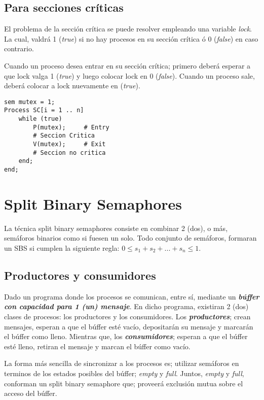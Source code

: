 \documentclass[a4paper, 10pt]{report}
\begin{document}
\subsection{Para secciones críticas}

El problema de la sección crítica se puede resolver empleando una variable \emph{lock}. La cual, valdrá 1 (\emph{true}) si no hay procesos en su sección crítica ó 0 (\emph{false}) en caso contrario.

Cuando un proceso desea entrar en su sección crítica; primero deberá esperar a que lock valga 1 (\emph{true}) y luego colocar lock en 0 (\emph{false}). Cuando un proceso sale, deberá colocar a lock nuevamente en (\emph{true}).

\begin{lstlisting}
sem mutex = 1;
Process SC[i = 1 .. n]
    while (true)
        P(mutex);     # Entry
        # Seccion Critica
        V(mutex);     # Exit
        # Seccion no critica
    end;
end;
\end{lstlisting}

\section{Split Binary Semaphores}

La técnica split binary semaphores consiste en combinar 2 (dos), o más, semáforos binarios como si fuesen un solo. Todo conjunto de semáforos, formaran un SBS si cumplen la siguiente regla: $0 \leq s_{1} + s_{2} + ... + s_{n} \leq 1$.

\subsection{Productores y consumidores}

Dado un programa donde los procesos se comunican, entre sí, mediante un \textbf{\emph{búffer con capacidad para 1 (un) mensaje}}. En dicho programa, existiran 2 (dos) clases de procesos: los productores y los consumidores. Los \textbf{\emph{productores}}; crean mensajes, esperan a que el búffer esté vacío, depositarán su mensaje y marcarán el búffer como lleno. Mientras que, los \textbf{\emph{consumidores}}; esperan a que el búffer esté lleno, retiran el mensaje y marcan el búffer como vacío.

La forma más sencilla de sincronizar a los procesos es; utilizar semáforos en terminos de los estados posibles del búffer; \emph{empty} y \emph{full}. Juntos, \emph{empty} y \emph{full}, conforman un split binary semaphore que; proveerá exclusión mutua sobre el acceso del búffer.
\end{document}
